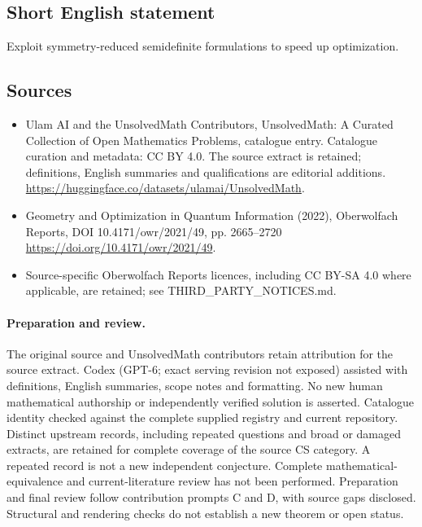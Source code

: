 \documentclass[11pt]{article}
\begin{document}
\subsection{Short English statement}
Exploit symmetry-reduced semidefinite formulations to speed up optimization.
\subsection{Sources}
\begin{itemize}
\item[\hypertarget{source:statement:1}{S1}] Ulam AI and the UnsolvedMath Contributors, UnsolvedMath: A Curated Collection of Open Mathematics Problems, catalogue entry. Catalogue curation and metadata: CC BY 4.0. The source extract is retained; definitions, English summaries and qualifications are editorial additions.
\url{https://huggingface.co/datasets/ulamai/UnsolvedMath}.
\item[\hypertarget{source:statement:2}{S2}] Geometry and Optimization in Quantum Information (2022), Oberwolfach Reports, DOI 10.4171/owr/2021/49, pp. 2665--2720
\url{https://doi.org/10.4171/owr/2021/49}.
\item Source-specific Oberwolfach Reports licences, including CC BY-SA 4.0 where applicable, are retained; see THIRD\_PARTY\_NOTICES.md.
\end{itemize}
\paragraph{Preparation and review.}
The original source and UnsolvedMath contributors retain attribution for the source extract. Codex (GPT-6; exact serving revision not exposed) assisted with definitions, English summaries, scope notes and formatting. No new human mathematical authorship or independently verified solution is asserted. Catalogue identity checked against the complete supplied registry and current repository. Distinct upstream records, including repeated questions and broad or damaged extracts, are retained for complete coverage of the source CS category. A repeated record is not a new independent conjecture. Complete mathematical-equivalence and current-literature review has not been performed. Preparation and final review follow contribution prompts C and D, with source gaps disclosed. Structural and rendering checks do not establish a new theorem or open status.
\label{end:statement}
\end{document}

